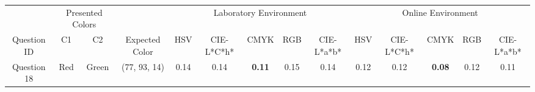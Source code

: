 \begin{table}[!htbp]
  \resizebox{\textwidth}{!} {
  \begin{tabular}{@{}cccccclccccclcccc@{}}
    \toprule
                                     & \multicolumn{2}{c}{Presented Colors}                        & \multicolumn{2}{c}{}                                                                                                  & \multicolumn{6}{c}{Laboratory Environment}                                                                                                                                                                                                                                                                     & \multicolumn{6}{c}{Online Environment}                                                                                                                                                                                                                                                                         \\ \cmidrule(lr){2-3} \cmidrule(l){6-17}
    \multirow{-2}{*}{Question ID}    & C1                           & C2                           & \multicolumn{2}{c}{\multirow{-2}{*}{Expected Color}}                                                                  & \multicolumn{2}{c}{HSV}                                    & CIE-L*C*h*                                                 & CMYK                                                       & RGB                                                        & CIE-L*a*b*                                                 & \multicolumn{2}{c}{HSV}                                    & CIE-L*C*h*                                                 & CMYK                                                       & RGB                                                        & CIE-L*a*b*                                                 \\ \midrule
    \multicolumn{1}{c|}{Question 18} & \multicolumn{1}{c|}{Red}     & \multicolumn{1}{c|}{Green}   & \multicolumn{2}{c||}{\cellcolor[HTML]{FFFF00}(77, 93, 14)}                                                             & \multicolumn{2}{c|}{0.14}                                  & \multicolumn{1}{c|}{0.14}                                  & \multicolumn{1}{c|}{\cellcolor[HTML]{32CB00}\textbf{0.11}} & \multicolumn{1}{c|}{0.15}                                  & \multicolumn{1}{c||}{0.14}                                  & \multicolumn{2}{c|}{\cellcolor[HTML]{FFFFFF}0.12}          & \multicolumn{1}{c|}{\cellcolor[HTML]{FFFFFF}0.12}          & \multicolumn{1}{c|}{\cellcolor[HTML]{32CB00}\textbf{0.08}} & \multicolumn{1}{c|}{\cellcolor[HTML]{FFFFFF}0.12}          & \multicolumn{1}{c|}{0.11}                                  \\ \midrule

\end{tabular}}
\end{table}
